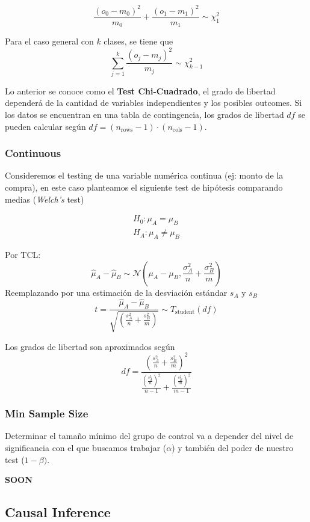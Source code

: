 $$ \frac{(o_0 - m_0)^2}{m_0} + \frac{(o_1 - m_1)^2}{m_1} \sim \chi^2_{1} $$ 

Para el caso general con $k$ clases, se tiene que 
$$ \sum_{j=1}^{k}\frac{(o_j - m_j)^2}{m_j} \sim \chi^2_{k-1}$$ 

Lo anterior se conoce como el \textbf{Test Chi-Cuadrado}, el grado de libertad dependerá de la cantidad de variables independientes y los posibles outcomes. Si los datos se encuentran en una tabla de contingencia, los grados de libertad $df$ se pueden calcular según $df = (n_{\text{rows}} - 1)\cdot (n_{\text{cols}} - 1)$.


\subsubsection{Continuous}

Consideremos el testing de una variable numérica continua (ej: monto de la compra), en este caso planteamos el siguiente test de hipótesis comparando medias (\textit{Welch's} test)

\begin{equation*}
\begin{aligned}
    H_0: \mu_A = \mu_B \\ 
    H_A: \mu_A \neq \mu_B
\end{aligned}
\end{equation*}

Por TCL: 
$$
\hat{\mu}_A - \hat{\mu}_B \sim \mathcal{N} \left ( \mu_A - \mu_B , \frac{\sigma^2_A}{n} + \frac{\sigma^2_B}{m} \right )
$$
Reemplazando por una estimación de la desviación estándar $s_A$ y $s_B$
$$
t = \frac{\hat{\mu}_A - \hat{\mu}_B}{\sqrt{\left ( \frac{s^2_A}{n} + \frac{s^2_B}{m} \right )}} \sim T_{\text{student}}(df)
$$

Los grados de libertad son aproximados según 
$$
df = \frac{\left ( \frac{s^2_A}{n} + \frac{s^2_B}{m} \right )^2}{ \frac{\left(\frac{s^2_A}{n}\right)^2}{n-1} + \frac{\left(\frac{s^2_B}{m}\right )^2}{m-1}}
$$

\subsubsection{Min Sample Size}

Determinar el tamaño mínimo del grupo de control va a depender del nivel de significancia con el que buscamos trabajar ($\alpha$) y también del poder de nuestro test ($1-\beta)$. 

\textbf{SOON}

\subsection{Causal Inference}

